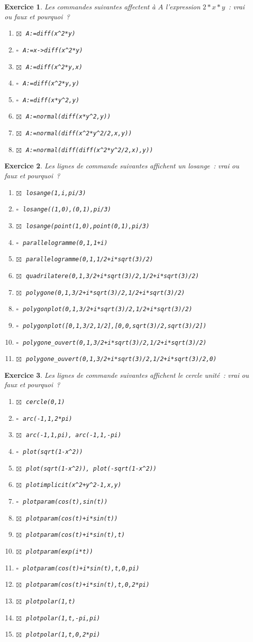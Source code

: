 \documentclass{article}
\newcommand{\faux}{$\square\;$}
\newcommand{\vrai}{$\boxtimes\;$}
\newcommand{\itemf}{\item\faux}
\newcommand{\itemvv}{\item\vrai}
\newtheorem{exo}{Exercice}[section]
\begin{document}
\begin{exo}{\rm
Les commandes suivantes affectent \`a $A$ l'expression $2*x*y$~: 
vrai ou faux et pourquoi~?
\begin{enumerate}
\itemvv
\verb|A:=diff(x^2*y)|
\itemf
\verb|A:=x->diff(x^2*y)|
\itemvv
\verb|A:=diff(x^2*y,x)|
\itemf
\verb|A:=diff(x^2*y,y)|
\itemf
\verb|A:=diff(x*y^2,y)|
\itemvv
\verb|A:=normal(diff(x*y^2,y))|
\itemvv
\verb|A:=normal(diff(x^2*y^2/2,x,y))|
\itemvv
\verb|A:=normal(diff(diff(x^2*y^2/2,x),y))|
\end{enumerate}
}\end{exo}
\begin{exo}{\rm
Les lignes de commande suivantes affichent
un losange~:
vrai ou faux et pourquoi~?
\begin{enumerate}
\itemvv
\verb|losange(1,i,pi/3)|
\itemf
\verb|losange((1,0),(0,1),pi/3)|
\itemvv
\verb|losange(point(1,0),point(0,1),pi/3)|
\itemf
\verb|parallelogramme(0,1,1+i)|
\itemvv
\verb|parallelogramme(0,1,1/2+i*sqrt(3)/2)|
\itemvv
\verb|quadrilatere(0,1,3/2+i*sqrt(3)/2,1/2+i*sqrt(3)/2)|
\itemvv
\verb|polygone(0,1,3/2+i*sqrt(3)/2,1/2+i*sqrt(3)/2)|
\itemf
\verb|polygonplot(0,1,3/2+i*sqrt(3)/2,1/2+i*sqrt(3)/2)|
\itemf
\verb|polygonplot([0,1,3/2,1/2],[0,0,sqrt(3)/2,sqrt(3)/2])|
\itemf
\verb|polygone_ouvert(0,1,3/2+i*sqrt(3)/2,1/2+i*sqrt(3)/2)|
\itemvv
\verb|polygone_ouvert(0,1,3/2+i*sqrt(3)/2,1/2+i*sqrt(3)/2,0)|
\end{enumerate}
}\end{exo}
\begin{exo}{\rm
Les lignes de commande suivantes affichent
le cercle unit\'e~:
vrai ou faux et pourquoi~?
\begin{enumerate}
\itemvv
\verb|cercle(0,1)|
\itemf
\verb|arc(-1,1,2*pi)|
\itemvv
\verb|arc(-1,1,pi), arc(-1,1,-pi)|
\itemf
\verb|plot(sqrt(1-x^2))|
\itemvv
\verb|plot(sqrt(1-x^2)), plot(-sqrt(1-x^2))|
\itemvv
\verb|plotimplicit(x^2+y^2-1,x,y)|
\itemf
\verb|plotparam(cos(t),sin(t))|
\itemvv
\verb|plotparam(cos(t)+i*sin(t))|
\itemvv
\verb|plotparam(cos(t)+i*sin(t),t)|
\itemvv
\verb|plotparam(exp(i*t))|
\itemf
\verb|plotparam(cos(t)+i*sin(t),t,0,pi)|
\itemvv
\verb|plotparam(cos(t)+i*sin(t),t,0,2*pi)|
\itemvv
\verb|plotpolar(1,t)|
\itemvv
\verb|plotpolar(1,t,-pi,pi)|
\itemvv
\verb|plotpolar(1,t,0,2*pi)|
\end{enumerate}
}\end{exo}
\end{document}
